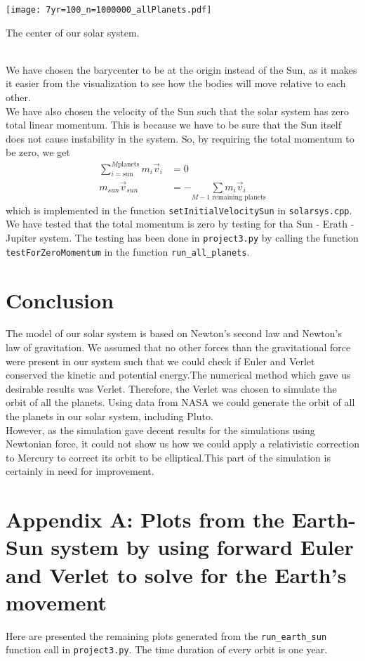 \documentclass[12pt]{article}
\begin{document}
		\centering
		\texttt{[image: 7yr=100\_n=1000000\_allPlanets.pdf]}
		\caption{The center of our solar system.} 
	\flushleft
	\hfill \\
	We have chosen the barycenter to be at the origin instead of the Sun, as it makes it easier from the visualization to see how the bodies will move relative to each other. \\ 
	We have also chosen the velocity of the Sun such that the solar system has zero total linear momentum. This is because we have to be sure that the Sun itself does not cause instability in the system. So, by requiring the total momentum to be zero, we get
	\begin{equation*}
	\begin{aligned}
	\sum_{i = \text{sun}}^{M \text{planets}} m_i\vec{v}_i &= 0 \\
	m_{sun}\vec{v}_{sun} &= - \underset{M-1\text{ remaining planets}}{\sum m_i\vec{v}_i}
	\end{aligned}
	\end{equation*}
	which is implemented in the function \texttt{setInitialVelocitySun} in \texttt{solarsys.cpp}. We have tested that the total momentum is zero by testing for tha Sun - Erath - Jupiter system. The testing has been done in \texttt{project3.py} by calling the function \texttt{testForZeroMomentum} in the function \texttt{run\_all\_planets}.
	\section{Conclusion} 
	 The model of our solar system is based on Newton's second law and Newton's law of gravitation. We assumed that no other forces than the gravitational force were present in our system such that we could check if Euler and Verlet conserved the kinetic and potential energy.The numerical method which gave us desirable results was Verlet. Therefore, the Verlet was chosen to simulate the orbit of all the planets. Using data from NASA we could generate the orbit of all the planets in our solar system, including Pluto.  \hfill \\However, as the simulation gave decent results for the simulations using Newtonian force, it could not show us how we could apply a relativistic correction to Mercury to correct its orbit to be elliptical.This part of the simulation is certainly in need for improvement. \\ 
	\nocite{orbitalSpeed}
	\nocite{errorshereandthere}
	{}
	
	\newpage
	\section*{Appendix A: Plots from the Earth-Sun system by using forward Euler and Verlet to solve for the Earth's movement} \label{app:A}
	Here are presented the remaining plots generated from the \texttt{run\_earth\_sun} function call in \texttt{project3.py}.
	The time duration of every orbit is one year.
\end{document}

